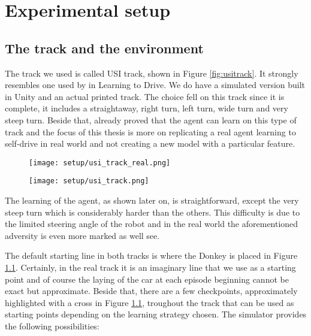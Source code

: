 \chapter{Experimental setup}

\section{The track and the environment} \label{sec:track}
The track we used is called USI track, shown in Figure \ref{fig:usitrack}. It strongly resembles one used by \citet{DBLP:journals/corr/abs-2008-00715} in Learning to Drive. We do have a simulated version built in Unity and an actual printed track. The choice fell on this track since it is complete, it includes a straightaway, right turn, left turn, wide turn and very steep turn. Beside that, \citet{DBLP:journals/corr/abs-2008-00715} already proved that the agent can learn on this type of track and the focus of this thesis is more on replicating a real agent learning to self-drive in real world and not creating a new model with a particular feature.

\begin{figure}[h]
    \centering
\begin{minipage}{.5\textwidth}
    \centering
    \texttt{[image: setup/usi\_track\_real.png]}
    \label{fig:usitrack}
\end{minipage}%
\begin{minipage}{.5\textwidth}
    \centering
    \texttt{[image: setup/usi\_track.png]}
    \label{fig:usitracksim}
\end{minipage}
\end{figure}

The learning of the agent, as shown later on, is straightforward, except the very steep turn which is considerably harder than the others. This difficulty is due to the limited steering angle of the robot and in the real world the aforementioned adversity is even more marked as well see. 

The default starting line in both tracks is where the Donkey is placed in Figure \ref{fig:usitracksim}. Certainly, in the real track it is an imaginary line that we use as a starting point and of course the laying of the car at each episode beginning cannot be exact but approximate. Beside that, there are a few checkpoints, approximately highlighted with a cross in Figure \ref{fig:usitracksim}, troughout the track that can be used as starting points depending on the learning strategy chosen. The simulator provides the following possibilities:

